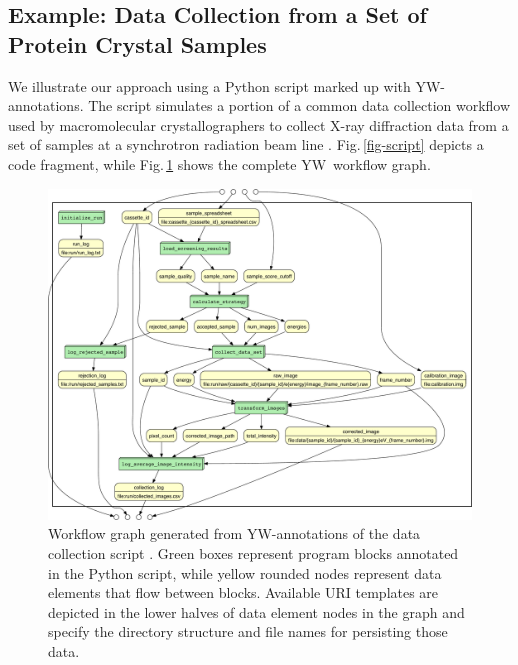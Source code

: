 \documentclass[letterpaper,twocolumn,10pt]{article}
\newcommand{\figref}[1]{Fig.\,\ref{#1}}
\newcommand{\YW}{\textsf{YesWorkflow}}
\newcommand{\yw}{\textsf{YW}}
\begin{document}


\subsection{Example: Data Collection from a Set of Protein Crystal
  Samples}
We illustrate our approach using a Python script marked up with
\yw-annotations.  The script simulates a portion of a common data
collection workflow used by macromolecular crystallographers to
collect X-ray diffraction data from a set of samples at a synchrotron
radiation beam line \protect\cite{tsai2013autodrug}.
\figref{fig-script} depicts a code fragment, while
\figref{fig-wfgraph} shows the complete \yw\ workflow graph.


\begin{figure}[th]
  \centering
  \includegraphics[width=.8\textwidth]{combined-crop.pdf}
  \caption{\small Workflow graph generated from \yw-annotations of the
    data collection script \cite{mcphillips2015example}.  Green boxes
    represent program blocks annotated in the Python script, while
    yellow rounded nodes represent data elements that flow between
    blocks.  Available URI templates are 
    depicted in the lower halves of data element nodes in
    the graph and specify the directory structure and file names for
    persisting those data. }
  \label{fig-wfgraph}
\end{figure}
\end{document}
